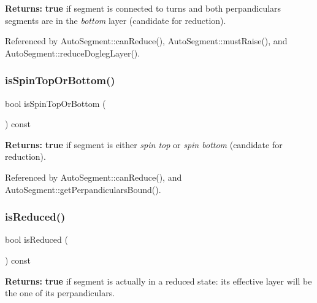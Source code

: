 {\bfseries Returns\+:} {\bfseries true} if segment is connected to turns and both perpandiculars segments are in the {\itshape bottom} layer (candidate for reduction). 

Referenced by Auto\+Segment\+::can\+Reduce(), Auto\+Segment\+::must\+Raise(), and Auto\+Segment\+::reduce\+Dogleg\+Layer().

\mbox{\label{classKatabatic_1_1AutoSegment_a90d934f7275aed35f4ecb157c6950d6f}} 
\subsubsection{\texorpdfstring{is\+Spin\+Top\+Or\+Bottom()}{isSpinTopOrBottom()}}
{\footnotesize\ttfamily bool is\+Spin\+Top\+Or\+Bottom (\begin{DoxyParamCaption}{ }\end{DoxyParamCaption}) const\hspace{0.3cm}{\ttfamily [inline]}}

{\bfseries Returns\+:} {\bfseries true} if segment is either {\itshape spin top} or {\itshape spin bottom} (candidate for reduction). 

Referenced by Auto\+Segment\+::can\+Reduce(), and Auto\+Segment\+::get\+Perpandiculars\+Bound().

\mbox{\label{classKatabatic_1_1AutoSegment_a461c31a8d12458939b78ccecb3b8c299}} 
\subsubsection{\texorpdfstring{is\+Reduced()}{isReduced()}}
{\footnotesize\ttfamily bool is\+Reduced (\begin{DoxyParamCaption}{ }\end{DoxyParamCaption}) const\hspace{0.3cm}{\ttfamily [inline]}}

{\bfseries Returns\+:} {\bfseries true} if segment is actually in a reduced state\+: it\textquotesingle{}s effective layer will be the one of it\textquotesingle{}s perpandiculars. 

